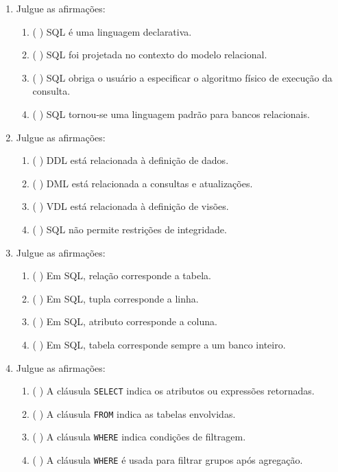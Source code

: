 \documentclass[12pt,a4paper]{article}
\begin{document}
\begin{enumerate}[resume,label=\textbf{Q\arabic*.}]

\item Julgue as afirmações:

\begin{enumerate}[label=\alph*)]
    \item ( \quad ) SQL é uma linguagem declarativa.
    \item ( \quad ) SQL foi projetada no contexto do modelo relacional.
    \item ( \quad ) SQL obriga o usuário a especificar o algoritmo físico de execução da consulta.
    \item ( \quad ) SQL tornou-se uma linguagem padrão para bancos relacionais.
\end{enumerate}

\item Julgue as afirmações:

\begin{enumerate}[label=\alph*)]
    \item ( \quad ) DDL está relacionada à definição de dados.
    \item ( \quad ) DML está relacionada a consultas e atualizações.
    \item ( \quad ) VDL está relacionada à definição de visões.
    \item ( \quad ) SQL não permite restrições de integridade.
\end{enumerate}

\item Julgue as afirmações:

\begin{enumerate}[label=\alph*)]
    \item ( \quad ) Em SQL, relação corresponde a tabela.
    \item ( \quad ) Em SQL, tupla corresponde a linha.
    \item ( \quad ) Em SQL, atributo corresponde a coluna.
    \item ( \quad ) Em SQL, tabela corresponde sempre a um banco inteiro.
\end{enumerate}

\item Julgue as afirmações:

\begin{enumerate}[label=\alph*)]
    \item ( \quad ) A cláusula \texttt{SELECT} indica os atributos ou expressões retornadas.
    \item ( \quad ) A cláusula \texttt{FROM} indica as tabelas envolvidas.
    \item ( \quad ) A cláusula \texttt{WHERE} indica condições de filtragem.
    \item ( \quad ) A cláusula \texttt{WHERE} é usada para filtrar grupos após agregação.
\end{enumerate}


\end{enumerate}
\end{document}
